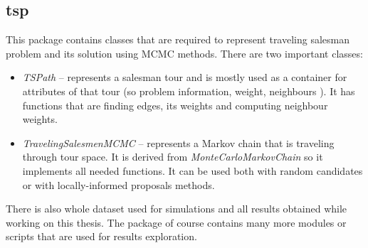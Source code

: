 \subsection{tsp}
	This package contains classes that are required to represent traveling salesman problem and its solution using MCMC methods. There are two important classes:
	\begin{itemize}
		\item \textit{TSPath} -- represents a salesman tour and is mostly used as a container for attributes of that tour (so problem information, weight, neighbours \etc). It has functions that are finding edges, its weights and computing neighbour weights.
		\item \textit{TravelingSalesmenMCMC} -- represents a Markov chain that is traveling through tour space. It is derived from \textit{MonteCarloMarkovChain} so it implements all needed functions. It can be used both with random candidates or with locally-informed proposals methods.
	\end{itemize}
	There is also whole dataset used for simulations and all results obtained while working on this thesis. The package of course contains many more modules or scripts that are used for results exploration.